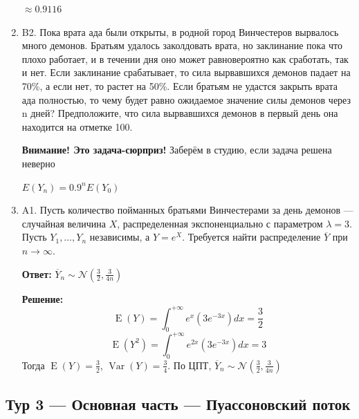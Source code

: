 \documentclass[12pt]{article}
\DeclareMathOperator{\Var}{Var}
\DeclareMathOperator{\E}{E}
\def \cN{\mathcal{N}}
\newenvironment{problem}{}{}
\newenvironment{sol}{}{} %
\begin{document}
\begin{enumerate}
\begin{problem}
\begin{sol}
$\approx 0.9116$
\end{sol}
\end{problem}

\begin{problem}
\item[B2.] Пока врата ада были открыты, в родной город Винчестеров вырвалось много демонов. Братьям удалось заколдовать врата, но заклинание пока что плохо работает, и в течении дня оно может равновероятно как сработать, так и нет. Если заклинание срабатывает, то сила вырвавшихся демонов падает на 70\%, а если нет, то растет на 50\%. Если братьям не удастся закрыть врата ада полностью, то чему будет равно ожидаемое значение силы демонов через n дней? Предположите, что сила вырвавшихся демонов в первый день она находится на отметке 100.

\begin{sol}
\textbf{Внимание! Это задача-сюрприз!} Заберём в студию, если задача решена неверно

$E(Y_n) = 0.9^n E(Y_0)$
\end{sol}
\end{problem}

\begin{problem}
\item[A1.] Пусть количество пойманных братьями Винчестерами за день демонов — случайная величина $X$, распределенная экспоненциально с параметром $\lambda=3$. Пусть $Y_1, \ldots, Y_n$ независимы, а $Y=e^X$. Требуется найти распределение $\overline{Y}$ при $n \rightarrow \infty$.

\begin{sol}
\textbf{Ответ:} $\overline{Y}_n \sim \cN \left(\frac{3}{2}, \frac{3}{4n}\right) $

\textbf{Решение:} 
\[
\E(Y) = \int_{0}^{+\infty} e^{x} (3e^{-3x}) dx = \frac{3}{2}
\]
\[
\E(Y^2) = \int_{0}^{+\infty} e^{2x}(3e^{-3x}) dx =3
\]
Тогда $\E(Y) = \frac{3}{2}$, $\Var(Y) = \frac{3}{4}$. По ЦПТ, $\overline{Y}_n \sim \cN \left(\frac{3}{2}, \frac{3}{4n}\right) $
\end{sol}
\end{problem}

\end{enumerate}



\newpage
\subsection{Тур 3 — Основная часть — Пуассоновский поток}
\end{document}
